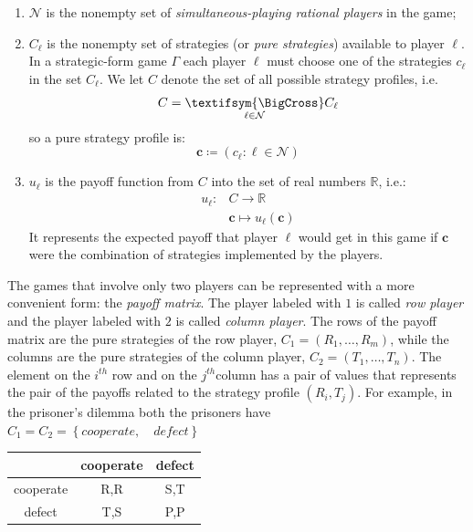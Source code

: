 \begin{enumerate}
\item $\mathcal{N}$ is the nonempty set of \textit{simultaneous-playing
rational players} in the game;
\item $C_{\ell}$ is the nonempty set of strategies (or \textit{pure strategies})
available to player $\ell$. In a strategic-form game $\Gamma$ each
player $\ell$ must choose one of the strategies $c_{\ell}$ in the
set $C_{\ell}$. We let $C$ denote the set of all possible strategy
profiles, i.e. \[C=\underset{\ell\in\mathcal{N}}{\textifsym{\BigCross}} C_{\ell}\]
so a pure strategy profile is:
\[
\mathbf{c}\coloneqq\left(c_{\ell}:\ell\in\mathcal{N}\right)
\]
\item $u_{\ell}$ is the payoff function from $C$ into the set of real
numbers $\mathbb{R}$, i.e.:
\begin{align*}
u_{\ell}: & C\rightarrow\mathbb{R}\\
 & \mathbf{c}\mapsto u_{\ell}\left(\mathbf{c}\right)
\end{align*}
It represents the expected payoff that player $\ell$ would get in
this game if $\mathbf{c}$ were the combination of strategies implemented
by the players. 
\end{enumerate}
The games that involve only two players can be represented with a
more convenient form: the \textit{payoff matrix}. The player labeled
with $1$ is called \textit{row player} and the player labeled with
$2$ is called \textit{column player}. The rows of the payoff matrix
are the pure strategies of the row player, $C_{1}=\left(R_{1},\dots,R_{m}\right)$,
while the columns are the pure strategies of the column player, $C_{2}=\left(T_{1},\dots,T_{n}\right)$.
The element on the $i^{th}$ row and on the $j^{th}$column has a
pair of values that represents the pair of the payoffs related to
the strategy profile $\left(R_{i},T_{j}\right)$. For example, in
the prisoner's dilemma both the prisoners have $C_{1}=C_{2}=\left\{ cooperate,\quad defect\right\} $
\begin{center}
\begin{tabular}{|c|c|c|}
\hline 
 & cooperate & defect\tabularnewline
\hline 
\hline 
cooperate & R,R & S,T\tabularnewline
\hline 
defect & T,S & P,P\tabularnewline
\hline 
\end{tabular}
\par\end{center}

